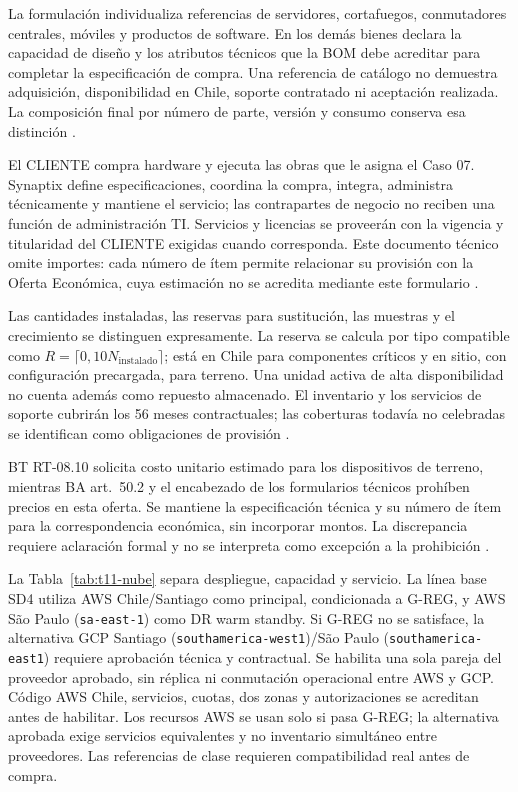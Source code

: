 La formulación individualiza referencias de servidores, cortafuegos, conmutadores centrales, móviles y productos de software. En los demás bienes declara la capacidad de diseño y los atributos técnicos que la BOM debe acreditar para completar la especificación de compra. Una referencia de catálogo no demuestra adquisición, disponibilidad en Chile, soporte contratado ni aceptación realizada. La composición final por número de parte, versión y consumo conserva esa distinción \parencite[secc.~1.5--1.6, pp.~4--5; RT-08.01, p.~18]{pucv-transversal}.

El CLIENTE compra hardware y ejecuta las obras que le asigna el Caso 07. Synaptix define especificaciones, coordina la compra, integra, administra técnicamente y mantiene el servicio; las contrapartes de negocio no reciben una función de administración TI. Servicios y licencias se proveerán con la vigencia y titularidad del CLIENTE exigidas cuando corresponda. Este documento técnico omite importes: cada número de ítem permite relacionar su provisión con la Oferta Económica, cuya estimación no se acredita mediante este formulario \parencites[arts.~14 y 50.2, pp.~10 y 29]{pucv-admin}[cap.~11; cap.~17, secc.~17.4]{caso07}.

Las cantidades instaladas, las reservas para sustitución, las muestras y el crecimiento se distinguen expresamente. La reserva se calcula por tipo compatible como $R=\lceil0,10N_{\mathrm{instalado}}\rceil$; está en Chile para componentes críticos y en sitio, con configuración precargada, para terreno. Una unidad activa de alta disponibilidad no cuenta además como repuesto almacenado. El inventario y los servicios de soporte cubrirán los 56 meses contractuales; las coberturas todavía no celebradas se identifican como obligaciones de provisión \parencite[secc.~8.4, pp.~19--20]{pucv-transversal}.

BT RT-08.10 solicita costo unitario estimado para los dispositivos de terreno, mientras BA art.~50.2 y el encabezado de los formularios técnicos prohíben precios en esta oferta. Se mantiene la especificación técnica y su número de ítem para la correspondencia económica, sin incorporar montos. La discrepancia requiere aclaración formal y no se interpreta como excepción a la prohibición \parencites[RT-08.10, p.~19]{pucv-transversal}[art.~50.2, p.~29; Formulario T-11, p.~62]{pucv-admin}.

La Tabla~\ref{tab:t11-nube} separa despliegue, capacidad y servicio. La línea base SD4 utiliza AWS Chile/Santiago como principal, condicionada a G-REG, y AWS São Paulo (\texttt{sa-east-1}) como DR warm standby. Si G-REG no se satisface, la alternativa GCP Santiago (\texttt{southamerica-west1})/São Paulo (\texttt{southamerica-east1}) requiere aprobación técnica y contractual. Se habilita una sola pareja del proveedor aprobado, sin réplica ni conmutación operacional entre AWS y GCP. Código AWS Chile, servicios, cuotas, dos zonas y autorizaciones se acreditan antes de habilitar. Los recursos AWS se usan solo si pasa G-REG; la alternativa aprobada exige servicios equivalentes y no inventario simultáneo entre proveedores. Las referencias de clase requieren compatibilidad real antes de compra.

